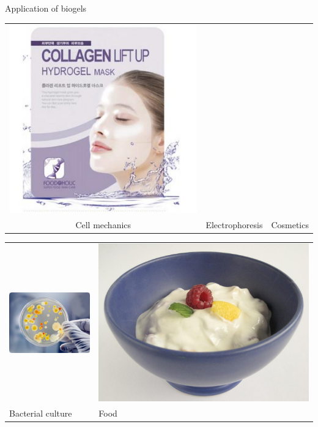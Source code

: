 \documentclass[xcolor=table]{beamer}
\begin{document}
\begin{frame}{Application of biogels}
\begin{tabu}{cX[c]c}
\includegraphics[height=0.3\textheight]{cosmetics} \\
Cell mechanics & Electrophoresis & Cosmetics\\
\end{tabu}
\begin{tabu}{X[c]X[c]}
\includegraphics[height=0.3\textheight]{bacterial_culture} &
\includegraphics[height=0.3\textheight]{food} \\
Bacterial culture & Food\\
\end{tabu}


\end{frame}
\end{document}
